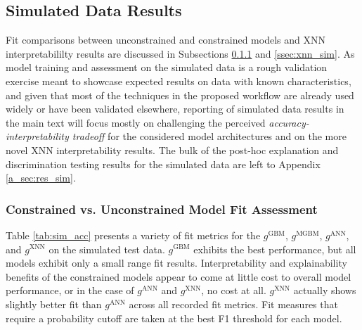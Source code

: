 \documentclass[information,article,submit,moreauthors,pdftex]{definitions/mdpi}
\begin{document}
\subsection{Simulated Data Results}

Fit comparisons between unconstrained and constrained models and XNN interpretabililty results are discussed in Subsections \ref{ssec:c_v_uc_sim} and \ref{ssec:xnn_sim}. As model training and assessment on the simulated data is a rough validation exercise meant to showcase expected results on data with known characteristics, and given that most of the techniques in the proposed workflow are already used widely or have been validated elsewhere, reporting of simulated data results in the main text will focus mostly on challenging the perceived \textit{accuracy-interpretability tradeoff} for the considered model architectures and on the more novel XNN interpretability results. The bulk of the post-hoc explanation and discrimination testing results for the simulated data are left to Appendix \ref{a_sec:res_sim}. 

\subsubsection{Constrained vs. Unconstrained Model Fit Assessment}\label{ssec:c_v_uc_sim}

Table \ref{tab:sim_acc} presents a variety of fit metrics for the $g^\text{GBM}$, $g^\text{MGBM}$, $g^\text{ANN}$, and $g^\text{XNN}$ on the simulated test data. $g^\text{GBM}$ exhibits the best performance, but all models exhibit only a small range fit results. Interpretability and explainability benefits of the constrained models appear to come at little cost to overall model performance, or in the case of $g^\text{ANN}$ and $g^\text{XNN}$, no cost at all. $g^\text{XNN}$ actually shows slightly better fit than $g^\text{ANN}$ across all recorded fit metrics. Fit measures that require a probability cutoff are taken at the best F1 threshold for each model.
\end{document}
